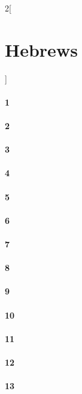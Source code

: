\documentclass{book}
\begin{document}
\begin{multicols}{2}[\part{Hebrews}]
\subsection*{1}
\subsection*{2}
\subsection*{3}
\subsection*{4}
\subsection*{5}
\subsection*{6}
\subsection*{7}
\subsection*{8}
\subsection*{9}
\subsection*{10}
\subsection*{11}
\subsection*{12}
\subsection*{13}
\end{multicols}
\end{document}
